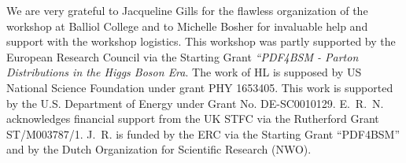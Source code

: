 We are very grateful to Jacqueline Gills for the flawless organization
of the workshop at Balliol College and to Michelle Bosher for
invaluable help and support with the workshop logistics.
%
This workshop was partly supported by the European Research Council via
the Starting Grant {\it ``PDF4BSM - Parton Distributions in the
  Higgs Boson Era}.
%
The work of HL is supposed by US National Science Foundation
under grant PHY 1653405.
%
This work is supported by
the U.S. Department of Energy under Grant No. DE-SC0010129.
%
E.~R.~N. acknowledges financial support from the
UK STFC via the Rutherford Grant ST/M003787/1.
%
J.~R. is funded by the ERC via the Starting Grant ``PDF4BSM'' and by the
Dutch Organization for Scientific Research (NWO).
